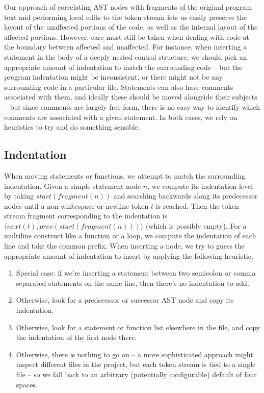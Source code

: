 Our approach of correlating AST nodes with fragments of the original program
text and performing local edits to the token stream lets us easily preserve the
layout of the unaffected portions of the code, as well as the internal layout
of the affected portions. However, care must still be taken when dealing with
code at the boundary between affected and unaffected. For instance, when
inserting a statement in the body of a deeply nested control structure, we
should pick an appropriate amount of indentation to match the surrounding code
-- but the program indentation might be inconsistent, or there might not be any
surrounding code in a particular file. Statements can also have comments
associated with them, and ideally these should be moved alongside their
subjects -- but since comments are largely free-form, there is no easy way to
identify which comments are associated with a given statement. In both cases,
we rely on heuristics to try and do something sensible.

\subsection{Indentation}

When moving statements or functions, we attempt to match the surrounding
indentation. Given a simple statement node $n$, we compute its indentation
level by taking $start(fragment(n))$ and searching backwards along its
predecessor nodes until a non-whitespace or newline token $t$ is reached. Then
the token stream fragment corresponding to the indentation is \newline $\langle
next(t), prev(start(fragment(n))) \rangle$ (which is possibly empty). For a
multiline construct like a function or a loop, we compute the indentation of
each line and take the common prefix. When inserting a node, we try to guess
the appropriate amount of indentation to insert by applying the following
heuristic.

\begin{enumerate}
  \item Special case: if we're inserting a statement between two semicolon or
    comma separated statements on the same line, then there's no indentation to
    add.
  \item Otherwise, look for a predecessor or successor AST node and copy its
    indentation.
  \item Otherwise, look for a statement or function list elsewhere in the file,
    and copy the indentation of the first node there.
  \item Otherwise, there is nothing to go on -- a more sophisticated approach
    might inspect different files in the project, but each token stream is tied
    to a single file -- so we fall back to an arbitrary (potentially
    configurable) default of four spaces.
\end{enumerate}

